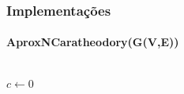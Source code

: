 \begin{frame}
\frametitle{Implementações}
\framesubtitle{AproxNCaratheodory(G(V,E))}
\begin{columns}[T]
\begin{column}{.6\textwidth}
\begin{algorithm}[H]
    \label{alg:aproximativo-numero-caratheodory-p3}
    \SetAlFnt{\tiny}
    \SetAlCapFnt{\small}
    \SetAlCapNameFnt{\small}
    \SetAlgoLined
    \DontPrintSemicolon
    \LinesNumbered
    \SetAlgoLined
    \BlankLine
    \BlankLine
    $c \gets 0$\\
    \caption{$AproximativoNCaratheodory(G(V,E))$}
\end{algorithm}
\end{column}
\end{columns}
\end{frame}

